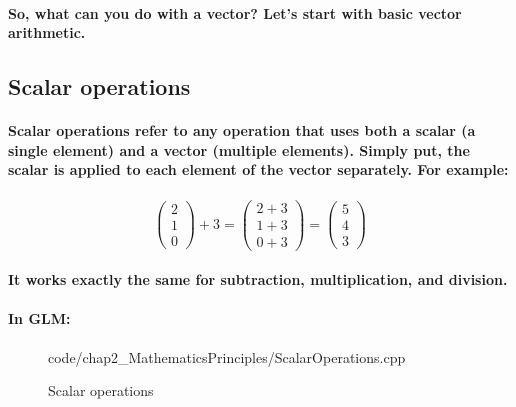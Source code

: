 \paragraph{
    So, what can you do with a vector? Let's start with basic vector arithmetic.
}

\subsection{\textsf{Scalar operations}}
\paragraph{
    Scalar operations refer to any operation that uses both a scalar (a single element) and a vector (multiple elements). Simply put, the scalar is applied to each element of the vector separately. For example:
}

\paragraph{
    \begin{equation*}
    \begin{pmatrix}
    2\\
    1\\
    0
    \end{pmatrix} +3=\begin{pmatrix}
    2+3\\
    1+3\\
    0+3
    \end{pmatrix} =\begin{pmatrix}
    5\\
    4\\
    3
    \end{pmatrix}
    \end{equation*}
}

\paragraph{
    It works exactly the same for subtraction, multiplication, and division.
}

\paragraph{
    In GLM:
}

\begin{frame}{}
    \begin{figure}[ht]
    \centering
    \colorbox{backgroundcolor}{
        \parbox{0.9\textwidth}{
            
            {code/chap2_MathematicsPrinciples/ScalarOperations.cpp}
        }
    }
    \caption{Scalar operations}
    \label{fig:scalar_operations}
    \end{figure}
\end{frame}


